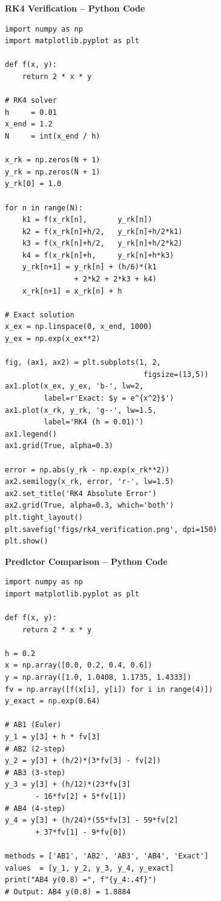 \documentclass[12pt]{beamer}
\begin{document}
\begin{frame}{\textbf{RK4 Verification -- Python Code}}
\begin{lstlisting}
import numpy as np
import matplotlib.pyplot as plt

def f(x, y):
    return 2 * x * y

# RK4 solver
h     = 0.01
x_end = 1.2
N     = int(x_end / h)

x_rk = np.zeros(N + 1)
y_rk = np.zeros(N + 1)
y_rk[0] = 1.0

for n in range(N):
    k1 = f(x_rk[n],       y_rk[n])
    k2 = f(x_rk[n]+h/2,   y_rk[n]+h/2*k1)
    k3 = f(x_rk[n]+h/2,   y_rk[n]+h/2*k2)
    k4 = f(x_rk[n]+h,     y_rk[n]+h*k3)
    y_rk[n+1] = y_rk[n] + (h/6)*(k1
                + 2*k2 + 2*k3 + k4)
    x_rk[n+1] = x_rk[n] + h

# Exact solution
x_ex = np.linspace(0, x_end, 1000)
y_ex = np.exp(x_ex**2)

fig, (ax1, ax2) = plt.subplots(1, 2,
                                figsize=(13,5))
ax1.plot(x_ex, y_ex, 'b-', lw=2,
         label=r'Exact: $y = e^{x^2}$')
ax1.plot(x_rk, y_rk, 'g--', lw=1.5,
         label='RK4 (h = 0.01)')
ax1.legend()
ax1.grid(True, alpha=0.3)

error = np.abs(y_rk - np.exp(x_rk**2))
ax2.semilogy(x_rk, error, 'r-', lw=1.5)
ax2.set_title('RK4 Absolute Error')
ax2.grid(True, alpha=0.3, which='both')
plt.tight_layout()
plt.savefig('figs/rk4_verification.png', dpi=150)
plt.show()
\end{lstlisting}
\end{frame}

\begin{frame}{\textbf{Predictor Comparison -- Python Code}}
\begin{lstlisting}
import numpy as np
import matplotlib.pyplot as plt

def f(x, y):
    return 2 * x * y

h = 0.2
x = np.array([0.0, 0.2, 0.4, 0.6])
y = np.array([1.0, 1.0408, 1.1735, 1.4333])
fv = np.array([f(x[i], y[i]) for i in range(4)])
y_exact = np.exp(0.64)

# AB1 (Euler)
y_1 = y[3] + h * fv[3]
# AB2 (2-step)
y_2 = y[3] + (h/2)*(3*fv[3] - fv[2])
# AB3 (3-step)
y_3 = y[3] + (h/12)*(23*fv[3]
       - 16*fv[2] + 5*fv[1])
# AB4 (4-step)
y_4 = y[3] + (h/24)*(55*fv[3] - 59*fv[2]
       + 37*fv[1] - 9*fv[0])

methods = ['AB1', 'AB2', 'AB3', 'AB4', 'Exact']
values  = [y_1, y_2, y_3, y_4, y_exact]
print("AB4 y(0.8) =", f"{y_4:.4f}")
# Output: AB4 y(0.8) = 1.8884
\end{lstlisting}
\end{frame}
\end{document}
